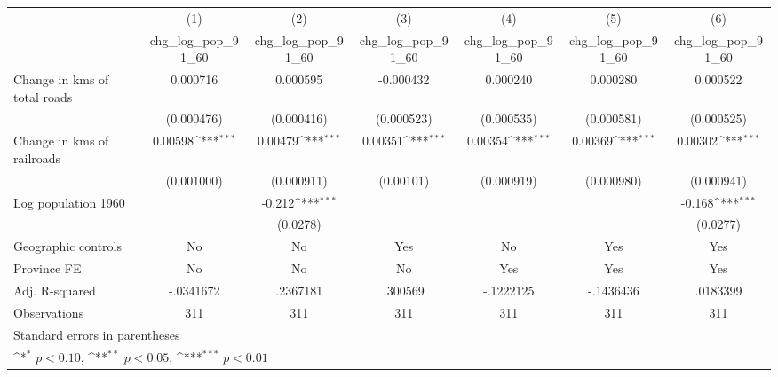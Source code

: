 {
\def\sym#1{\ifmmode^{#1}\else\(^{#1}\)\fi}
\begin{tabular}{l*{6}{c}}
\hline\hline
                    &\multicolumn{1}{c}{(1)}&\multicolumn{1}{c}{(2)}&\multicolumn{1}{c}{(3)}&\multicolumn{1}{c}{(4)}&\multicolumn{1}{c}{(5)}&\multicolumn{1}{c}{(6)}\\
                    &\multicolumn{1}{c}{chg\_log\_pop\_91\_60}&\multicolumn{1}{c}{chg\_log\_pop\_91\_60}&\multicolumn{1}{c}{chg\_log\_pop\_91\_60}&\multicolumn{1}{c}{chg\_log\_pop\_91\_60}&\multicolumn{1}{c}{chg\_log\_pop\_91\_60}&\multicolumn{1}{c}{chg\_log\_pop\_91\_60}\\
\hline
Change in kms of total roads&    0.000716         &    0.000595         &   -0.000432         &    0.000240         &    0.000280         &    0.000522         \\
                    &  (0.000476)         &  (0.000416)         &  (0.000523)         &  (0.000535)         &  (0.000581)         &  (0.000525)         \\
[1em]
Change in kms of railroads&     0.00598\sym{***}&     0.00479\sym{***}&     0.00351\sym{***}&     0.00354\sym{***}&     0.00369\sym{***}&     0.00302\sym{***}\\
                    &  (0.001000)         &  (0.000911)         &   (0.00101)         &  (0.000919)         &  (0.000980)         &  (0.000941)         \\
[1em]
Log population 1960 &                     &      -0.212\sym{***}&                     &                     &                     &      -0.168\sym{***}\\
                    &                     &    (0.0278)         &                     &                     &                     &    (0.0277)         \\
\hline
Geographic controls &          No         &          No         &         Yes         &          No         &         Yes         &         Yes         \\
Province FE         &          No         &          No         &          No         &         Yes         &         Yes         &         Yes         \\
Adj. R-squared      &   -.0341672         &    .2367181         &     .300569         &   -.1222125         &   -.1436436         &    .0183399         \\
Observations        &         311         &         311         &         311         &         311         &         311         &         311         \\
\hline\hline
\multicolumn{7}{l}{\footnotesize Standard errors in parentheses}\\
\multicolumn{7}{l}{\footnotesize \sym{*} \(p<0.10\), \sym{**} \(p<0.05\), \sym{***} \(p<0.01\)}\\
\end{tabular}
}
